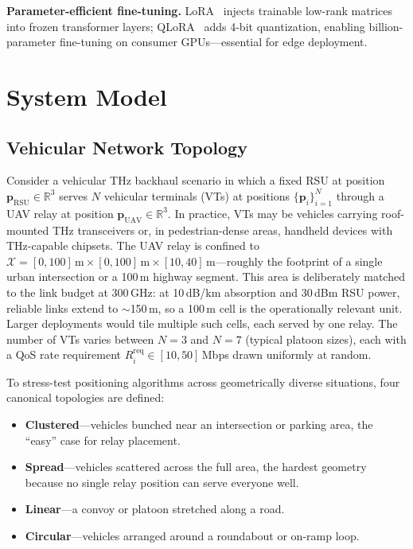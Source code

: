 \documentclass[journal]{IEEEtran}
\begin{document}
\textbf{Parameter-efficient fine-tuning.}
LoRA~\cite{hu2022lora} injects trainable low-rank matrices into frozen transformer layers; QLoRA~\cite{dettmers2023qlora} adds 4-bit quantization, enabling billion-parameter fine-tuning on consumer GPUs---essential for edge deployment.


\section{System Model}
\label{sec:system}

\subsection{Vehicular Network Topology}

Consider a vehicular THz backhaul scenario in which a fixed RSU at position $\mathbf{p}_\text{RSU} \in \mathbb{R}^3$ serves $N$ vehicular terminals (VTs) at positions $\{\mathbf{p}_i\}_{i=1}^{N}$ through a UAV relay at position $\mathbf{p}_\text{UAV} \in \mathbb{R}^3$. In practice, VTs may be vehicles carrying roof-mounted THz transceivers or, in pedestrian-dense areas, handheld devices with THz-capable chipsets. The UAV relay is confined to $\mathcal{X} = [0, 100]\,\text{m} \times [0, 100]\,\text{m} \times [10, 40]\,\text{m}$---roughly the footprint of a single urban intersection or a 100\,m highway segment. This area is deliberately matched to the link budget at 300\,GHz: at 10\,dB/km absorption and 30\,dBm RSU power, reliable links extend to ${\sim}$150\,m, so a 100\,m cell is the operationally relevant unit. Larger deployments would tile multiple such cells, each served by one relay. The number of VTs varies between $N = 3$ and $N = 7$ (typical platoon sizes), each with a QoS rate requirement $R_i^\text{req} \in [10, 50]$\,Mbps drawn uniformly at random.

To stress-test positioning algorithms across geometrically diverse situations, four canonical topologies are defined:
\begin{itemize}
    \item \textbf{Clustered}---vehicles bunched near an intersection or parking area, the ``easy'' case for relay placement.
    \item \textbf{Spread}---vehicles scattered across the full area, the hardest geometry because no single relay position can serve everyone well.
    \item \textbf{Linear}---a convoy or platoon stretched along a road.
    \item \textbf{Circular}---vehicles arranged around a roundabout or on-ramp loop.
\end{itemize}
\end{document}
